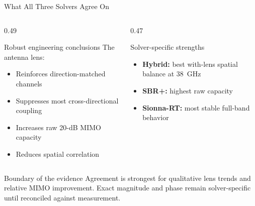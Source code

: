 \begin{frame}[t,shrink=20]{What All Three Solvers Agree On}
    \begin{columns}[T,onlytextwidth]
        \begin{column}{0.49\textwidth}
            \begin{exampleblock}{Robust engineering conclusions}
                The antenna lens:
                \begin{itemize}
                    \item Reinforces direction-matched channels
                    \item Suppresses most cross-directional coupling
                    \item Increases raw 20-dB MIMO capacity
                    \item Reduces spatial correlation
                \end{itemize}
            \end{exampleblock}
        \end{column}
        \begin{column}{0.47\textwidth}
            \begin{block}{Solver-specific strengths}
                \begin{itemize}
                    \item \textbf{Hybrid:} best with-lens spatial balance at
                    38~GHz
                    \item \textbf{SBR+:} highest raw capacity
                    \item \textbf{Sionna-RT:} most stable full-band behavior
                \end{itemize}
            \end{block}
        \end{column}
    \end{columns}
    \begin{alertblock}{Boundary of the evidence}
        Agreement is strongest for qualitative lens trends and relative MIMO
        improvement. Exact magnitude and phase remain solver-specific until
        reconciled against measurement.
    \end{alertblock}
\end{frame}
